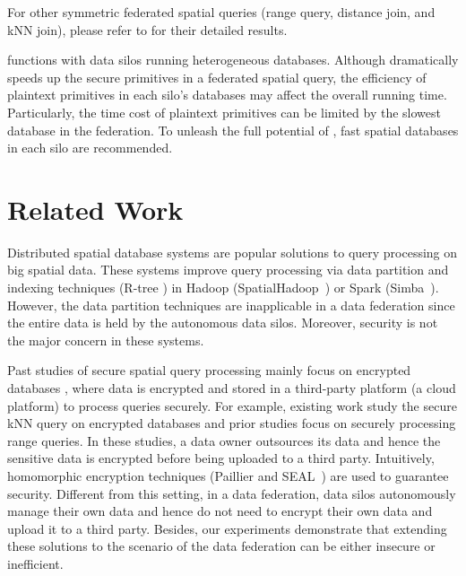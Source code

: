 For other symmetric federated spatial queries (\ie range query, distance join, and kNN join), please refer to  for their detailed results.

\sysname functions with data silos running heterogeneous databases.
Although \sysname dramatically speeds up the secure primitives in a federated spatial query, the efficiency of plaintext primitives in each silo's databases may affect the overall running time.
Particularly, the time cost of plaintext primitives can be limited by the slowest database in the federation.
To unleash the full potential of \sysname, fast spatial databases in each silo are recommended.

\section{Related Work}
\label{sec:related}

Distributed spatial database systems are popular solutions to query processing on big spatial data.
These systems improve query processing via data partition and indexing techniques (\eg R-tree \cite{DBLP:series/synthesis/2011Mamoulis}) in Hadoop (\eg SpatialHadoop~\cite{icde15spatialhadoop}) or Spark (\eg Simba~\cite{sigmod16simba}).
However, the data partition techniques are inapplicable in a data federation since the entire data is held by the autonomous data silos.
Moreover, security is not the major concern in these systems.

Past studies of secure spatial query processing mainly focus on encrypted databases \cite{hacigumucs2002executing}, where data is encrypted and stored in a third-party platform (\eg a cloud platform) to process queries securely.
For example, existing work \cite{DBLP:conf/sigmod/WongCKM09,DBLP:conf/icde/0002LX13,DBLP:conf/icde/ElmehdwiSJ14,DBLP:conf/edbt/KesarwaniKNPSMM18} study the secure kNN query on encrypted databases and prior studies \cite{DBLP:conf/icde/WangR13,DBLP:conf/icde/WuLLYYW19,DBLP:conf/icde/SahinAAAP18,DBLP:conf/edbt/TranAdA19} focus on securely processing range queries.
In these studies, a data owner outsources its data and hence the sensitive data is encrypted before being uploaded to a third party.
Intuitively, homomorphic encryption techniques (\eg Paillier and SEAL~\cite{DBLP:journals/csur/AcarAUC18}) are used to guarantee security. 
Different from this setting, in a data federation, data silos autonomously manage their own data and hence do not need to encrypt their own data and upload it to a third party.
Besides, our experiments demonstrate that extending these solutions \cite{DBLP:conf/icde/SahinAAAP18,DBLP:conf/edbt/KesarwaniKNPSMM18} to the scenario of the data federation can be either insecure or inefficient.


